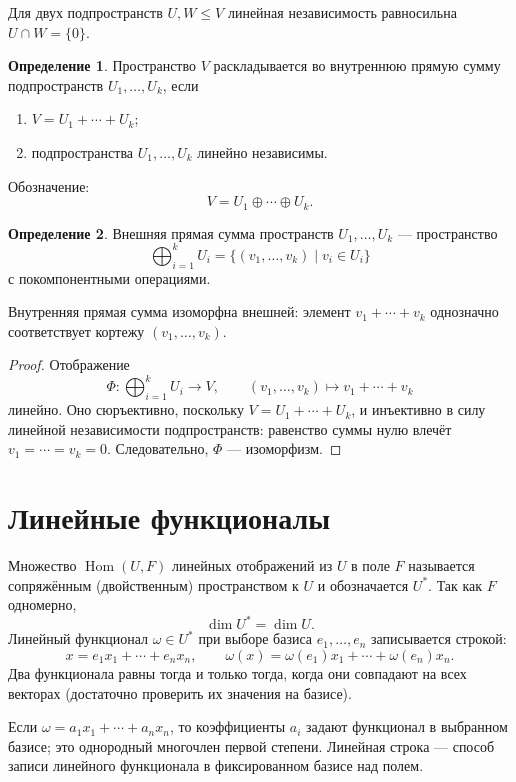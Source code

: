 \documentclass[12pt,a4paper,oneside,openany]{book}
\theoremstyle{definition}
\newtheorem{definition}{Определение}[chapter]
\theoremstyle{plain}
\theoremstyle{remark}
\begin{document}
Для двух подпространств $U,W\leq V$ линейная независимость равносильна
$U\cap W=\{0\}$.

\begin{definition}
Пространство $V$ раскладывается во внутреннюю прямую сумму подпространств
$U_1,\ldots,U_k$, если
\begin{enumerate}[label=\arabic*)]
  \item $V=U_1+\cdots+U_k$;
  \item подпространства $U_1,\ldots,U_k$ линейно независимы.
\end{enumerate}
Обозначение:
\[
  V=U_1\oplus\cdots\oplus U_k.
\]
\end{definition}


\begin{definition}
Внешняя прямая сумма пространств $U_1,\ldots,U_k$ --- пространство
\[
  \bigoplus_{i=1}^{k}U_i
  =\{(v_1,\ldots,v_k)\mid v_i\in U_i\}
\]
с покомпонентными операциями.
\end{definition}

Внутренняя прямая сумма изоморфна внешней: элемент
$v_1+\cdots+v_k$ однозначно соответствует кортежу
$(v_1,\ldots,v_k)$.

\begin{proof}
Отображение
\[
  \Phi\colon\bigoplus_{i=1}^{k}U_i\to V,\qquad
  (v_1,\ldots,v_k)\mapsto v_1+\cdots+v_k
\]
линейно. Оно сюръективно, поскольку $V=U_1+\cdots+U_k$, и инъективно
в силу линейной независимости подпространств: равенство суммы нулю
влечёт $v_1=\cdots=v_k=0$. Следовательно, $\Phi$ --- изоморфизм.
\end{proof}

\chapter{Линейные функционалы}

Множество $\operatorname{Hom}(U,F)$ линейных отображений из $U$ в поле
$F$ называется сопряжённым (двойственным) пространством к $U$ и
обозначается $U^*$. Так как $F$ одномерно,
\[
  \dim U^*=\dim U.
\]
Линейный функционал $\omega\in U^*$ при выборе базиса
$e_1,\ldots,e_n$ записывается строкой:
\[
  x=e_1x_1+\cdots+e_nx_n,
  \qquad
  \omega(x)=\omega(e_1)x_1+\cdots+\omega(e_n)x_n.
\]
Два функционала равны тогда и только тогда, когда они совпадают на всех
векторах (достаточно проверить их значения на базисе).


Если $\omega=a_1x_1+\cdots+a_nx_n$, то коэффициенты $a_i$ задают
функционал в выбранном базисе; это однородный многочлен первой степени.
Линейная строка --- способ записи линейного функционала в фиксированном
базисе над полем.
\end{document}
